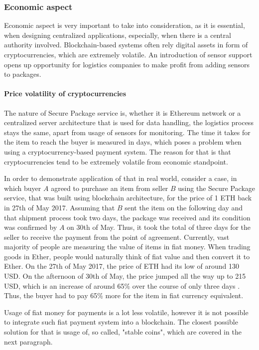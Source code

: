 \subsubsection{Economic aspect} \label{section:economics}
Economic aspect is very important to take into consideration, as it is essential, when designing centralized applications, especially, when there is a central authority involved. Blockchain-based systems often rely digital assets in form of cryptocurrencies, which are extremely volatile. An introduction of sensor support opens up opportunity for logistics companies to make profit from adding sensors to packages.

\paragraph{Price volatility of cryptocurrencies}
The nature of Secure Package service is, whether it is Ethereum network or a centralized server architecture that is used for data handling, the logistics process stays the same, apart from usage of sensors for monitoring. The time it takes for the item to reach the buyer is measured in days, which poses a problem when using a cryptocurrency-based payment system. The reason for that is that cryptocurrencies tend to be extremely volatile from economic standpoint.

In order to demonstrate application of that in real world, consider a case, in which buyer $A$ agreed to purchase an item from seller $B$ using the Secure Package service, that was built using blockchain architecture, for the price of 1 ETH back in 27th of May 2017. Assuming that $B$ sent the item on the following day and that shipment process took two days, the package was received and its condition was confirmed by $A$ on 30th of May. Thus, it took the total of three days for the seller to receive the payment from the point of agreement. Currently, vast majority of people are measuring the value of items in fiat money. When trading goods in Ether, people would naturally think of fiat value and then convert it to Ether. On the 27th of May 2017, the price of ETH had its low of around 130 USD. On the afternoon of 30th of May, the price jumped all the way up to 215 USD, which is an increase of around 65\% over the course of only three days \citep{ethprice}. Thus, the buyer had to pay 65\% more for the item in fiat currency equivalent.

Usage of fiat money for payments is a lot less volatile, however it is not possible to integrate such fiat payment system into a blockchain. The closest possible solution for that is usage of, so called, "stable coins", which are covered in the next paragraph.

